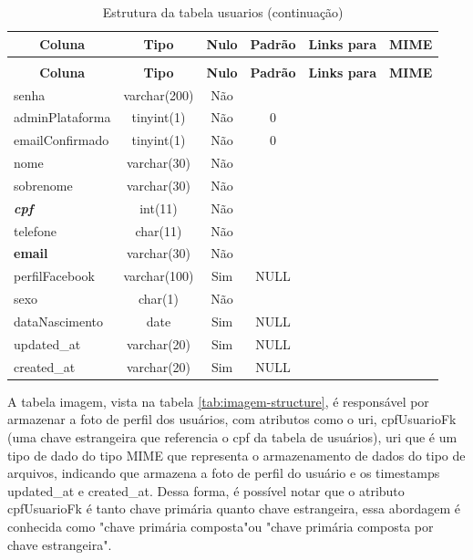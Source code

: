 \documentclass[tcc,capa]{texufpel}
\begin{document}
%
%
\begin{longtable}{|l|c|c|c|l|l|}
\caption{Estrutura da tabela usuarios} \label{tab:usuarios-structure} \\
\hline \multicolumn{1}{|c|}{\textbf{Coluna}} & \multicolumn{1}{|c|}{\textbf{Tipo}} & \multicolumn{1}{|c|}{\textbf{Nulo}} & \multicolumn{1}{|c|}{\textbf{Padrão}} & \multicolumn{1}{|c|}{\textbf{Links para}} & \multicolumn{1}{|c|}{\textbf{MIME}} \\ \hline \hline
\endfirsthead
\caption{Estrutura da tabela usuarios (continuação)} \\
\hline \multicolumn{1}{|c|}{\textbf{Coluna}} & \multicolumn{1}{|c|}{\textbf{Tipo}} & \multicolumn{1}{|c|}{\textbf{Nulo}} & \multicolumn{1}{|c|}{\textbf{Padrão}} & \multicolumn{1}{|c|}{\textbf{Links para}} & \multicolumn{1}{|c|}{\textbf{MIME}} \\ \hline \hline \endhead \endfoot
senha & varchar(200) & Não &  &  &  \\ \hline
adminPlataforma & tinyint(1) & Não & 0 &  &  \\ \hline
emailConfirmado & tinyint(1) & Não & 0 &  &  \\ \hline
nome & varchar(30) & Não &  &  &  \\ \hline
sobrenome & varchar(30) & Não &  &  &  \\ \hline
\textbf{\textit{cpf}} & int(11) & Não &  &  &  \\ \hline
telefone & char(11) & Não &  &  &  \\ \hline
\textbf{email} & varchar(30) & Não &  &  &  \\ \hline
perfilFacebook & varchar(100) & Sim & NULL &  &  \\ \hline
sexo & char(1) & Não &  &  &  \\ \hline
dataNascimento & date & Sim & NULL &  &  \\ \hline
updated\_at & varchar(20) & Sim & NULL &  &  \\ \hline
created\_at & varchar(20) & Sim & NULL &  &  \\ \hline
\end{longtable}


A tabela imagem, vista na tabela \ref{tab:imagem-structure}, é responsável por armazenar a foto de perfil dos usuários, com atributos como o uri, cpfUsuarioFk (uma chave estrangeira que referencia o cpf da tabela de usuários), uri que é um tipo de dado do tipo MIME que representa o armazenamento de dados do tipo de arquivos, indicando que armazena a foto de perfil do usuário e os timestamps updated\_at e created\_at. Dessa forma, é possível notar que o atributo cpfUsuarioFk é tanto chave primária quanto chave estrangeira, essa abordagem é conhecida como "chave primária composta"\space ou "chave primária composta por chave estrangeira". 
\end{document}
